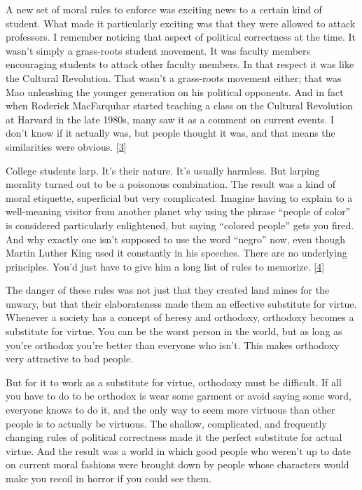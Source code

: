 A new set of moral rules to enforce was exciting news to a certain kind
of student. What made it particularly exciting was that they were
allowed to attack professors. I remember noticing that aspect of
political correctness at the time. It wasn't simply a grass-roots
student movement. It was faculty members encouraging students to attack
other faculty members. In that respect it was like the Cultural
Revolution. That wasn't a grass-roots movement either; that was Mao
unleashing the younger generation on his political opponents. And in
fact when Roderick MacFarquhar started teaching a class on the Cultural
Revolution at Harvard in the late 1980s, many saw it as a comment on
current events. I don't know if it actually was, but people thought it
was, and that means the similarities were obvious.
{[}\hyperref[f3n]{3}{]}

College students larp. It's their nature. It's usually harmless. But
larping morality turned out to be a poisonous combination. The result
was a kind of moral etiquette, superficial but very complicated. Imagine
having to explain to a well-meaning visitor from another planet why
using the phrase ``people of color'' is considered particularly
enlightened, but saying ``colored people'' gets you fired. And why
exactly one isn't supposed to use the word ``negro'' now, even though
Martin Luther King used it constantly in his speeches. There are no
underlying principles. You'd just have to give him a long list of rules
to memorize. {[}\hyperref[f4n]{4}{]}

The danger of these rules was not just that they created land mines for
the unwary, but that their elaborateness made them an effective
substitute for virtue. Whenever a society has a concept of heresy and
orthodoxy, orthodoxy becomes a substitute for virtue. You can be the
worst person in the world, but as long as you're orthodox you're better
than everyone who isn't. This makes orthodoxy very attractive to bad
people.

But for it to work as a substitute for virtue, orthodoxy must be
difficult. If all you have to do to be orthodox is wear some garment or
avoid saying some word, everyone knows to do it, and the only way to
seem more virtuous than other people is to actually be virtuous. The
shallow, complicated, and frequently changing rules of political
correctness made it the perfect substitute for actual virtue. And the
result was a world in which good people who weren't up to date on
current moral fashions were brought down by people whose characters
would make you recoil in horror if you could see them.

